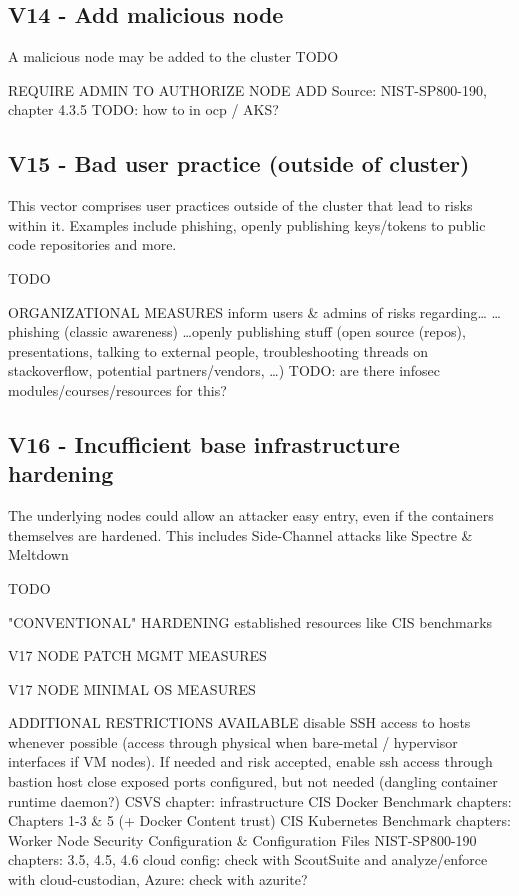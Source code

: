 \subsection{V14 - Add malicious node}
A malicious node may be added to the cluster
TODO

REQUIRE ADMIN TO AUTHORIZE NODE ADD
	Source: NIST-SP800-190, chapter 4.3.5      TODO: how to in ocp / AKS?


\subsection{V15 - Bad user practice (outside of cluster)}
This vector comprises user practices outside of the cluster that lead to risks within it. Examples include phishing, openly publishing keys/tokens to public code repositories and more.

TODO

ORGANIZATIONAL MEASURES
	inform users \& admins of risks regarding…	
		…phishing (classic awareness)
		…openly publishing stuff (open source (repos), presentations, talking to external people, troubleshooting threads on stackoverflow, potential partners/vendors, …) TODO: are there infosec modules/courses/resources for this?



\subsection{V16 - Incufficient base infrastructure hardening}
The underlying nodes could allow an attacker easy entry, even if the containers themselves are hardened. This includes Side-Channel attacks like Spectre \& Meltdown

TODO

"CONVENTIONAL" HARDENING
	established resources like CIS benchmarks

V17 NODE PATCH MGMT MEASURES

V17 NODE MINIMAL OS MEASURES
	
ADDITIONAL RESTRICTIONS AVAILABLE
	disable SSH access to hosts whenever possible (access through physical when bare-metal / hypervisor interfaces if VM nodes). If needed and risk accepted, enable ssh access through bastion host
	close exposed ports configured, but not needed (dangling container runtime daemon?)
	CSVS chapter: infrastructure
	CIS Docker Benchmark chapters: Chapters 1-3 \& 5 (+ Docker Content trust)
	CIS Kubernetes Benchmark chapters: Worker Node Security Configuration \& Configuration Files
	NIST-SP800-190 chapters: 3.5, 4.5, 4.6
	cloud config: check with ScoutSuite and analyze/enforce with cloud-custodian, Azure: check with azurite?

